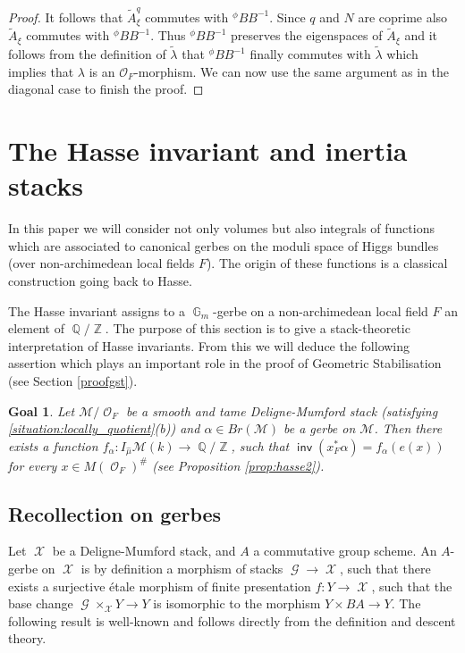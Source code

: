\documentclass{article}
\DeclareMathOperator{\inv}{\mathsf{inv}}
\DeclareMathOperator{\hash}{\#}
\DeclareMathOperator{\Xc}{\mathcal{X}}
\DeclareMathOperator{\Zb}{\mathbb{Z}}
\DeclareMathOperator{\G}{\mathbb{G}}
\newcommand{\Mc}{\mathcal{M}}
\DeclareMathOperator{\Gg}{\mathcal{G}}
\DeclareMathOperator{\Oo}{\mathcal{O}}
\DeclareMathOperator{\Qb}{\mathbb{Q}}
\newcommand{\CO}{{\mathcal O}}
\theoremstyle{definition}
\theoremstyle{plain}
\newtheorem{goal}[definition]{Goal}
\begin{document}
\begin{proof}
It follows that $\widetilde{A}_\xi^q$ commutes with $^\phi B	B^{-1}$. Since $q$ and $N$ are coprime also $\widetilde{A}_\xi$ commutes with $^\phi B	B^{-1}$. Thus $^\phi B	B^{-1}$ preserves the eigenspaces of $\widetilde{A}_\xi$ and it follows from the definition of $\tilde{\lambda}$ that $^\phi B	B^{-1}$ finally commutes with $\tilde{\lambda}$ which implies that $\lambda$ is an $\CO_F$-morphism. We can now use the same argument as in the diagonal case to finish the proof.
\end{proof}




\section{The Hasse invariant and inertia stacks}\label{sec:hasse}

In this paper we will consider not only volumes but also integrals of functions which are associated to canonical gerbes on the moduli space of Higgs bundles (over non-archimedean local fields $F$). The origin of these functions is a classical construction going back to Hasse. 

The Hasse invariant assigns to a $\G_m$-gerbe on a non-archimedean local field $F$ an element of $\Qb/\Zb$. The purpose of this section is to give a stack-theoretic interpretation of Hasse invariants. From this we will deduce the following assertion which plays an important role in the proof of Geometric Stabilisation (see Section \ref{proofgst}).


\begin{goal}
Let $\Mc/\Oo_F$ be a smooth and tame Deligne-Mumford stack (satisfying \ref{situation:locally_quotient}(b)) and $\alpha \in Br(\Mc)$ be a gerbe on $\Mc$. Then there exists a function $f_{\alpha}\colon I_{\widehat{\mu}}\Mc(k) \to \Qb/\Zb$, such that $\inv(x_F^*\alpha) = f_{\alpha}(e(x))$ for every $x \in M(\Oo_F)^{\hash}$ (see Proposition \ref{prop:hasse2}).
\end{goal}



\subsection{Recollection on gerbes}

Let $\Xc$ be a Deligne-Mumford stack, and $A$ a commutative group scheme. An $A$-gerbe on $\Xc$ is by definition a morphism of stacks $\Gg \to \Xc$, such that there exists a surjective \'etale morphism of finite presentation $f\colon Y \to \Xc$, such that the base change $\Gg \times_{\Xc} Y \to Y$ is isomorphic to the morphism $Y \times BA \to Y$. The following result is well-known and follows directly from the definition and descent theory.
\end{document}
